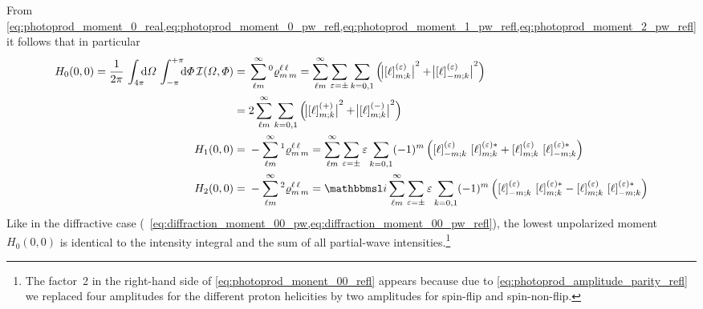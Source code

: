 From
\cref{eq:photoprod_moment_0_real,eq:photoprod_moment_0_pw_refl,eq:photoprod_moment_1_pw_refl,eq:photoprod_moment_2_pw_refl}
it follows that in particular
\begin{align}
  H_0(0, 0)
  = \frac{1}{2 \pi}\, \int_{4 \pi}\!\!\! \dif{\Omega}\, \int_{-\pi}^{+\pi}\!\!\! \dif{\Phi}\,
  \mathcal{I}(\Omega, \Phi)
  ={}& \sum_{\ell m}^\infty \prescript{0}{}{\varrho}^{\ell\, \ell}_{m\, m}
  = \sum_{\ell m}^\infty \sum_{\refl = \pm} \sum_{k = 0, 1}
  \rBrk[2]{\Abs[1]{\sBrk{\ell}^{(\refl)}_{m; k}}^2 + \Abs[1]{\sBrk{\ell}^{(\refl)}_{{-m}; k}}^2} \notag
  \\
  \label{eq:photoprod_monent_00_refl}
  ={}& 2 \sum_{\ell m}^\infty \sum_{k = 0, 1}
  \rBrk[2]{\Abs[1]{\sBrk{\ell}^{(+)}_{m; k}}^2 + \Abs[1]{\sBrk{\ell}^{(-)}_{m; k}}^2}
  \\
  H_1(0, 0)
  ={}& -\sum_{\ell m}^\infty \prescript{1}{}{\varrho}^{\ell\, \ell}_{m\, m}
  = \sum_{\ell m}^\infty \sum_{\refl = \pm} \refl \sum_{k = 0, 1}
  (-1)^m \rBrk[2]{\sBrk{\ell}^{(\refl)}_{{-m}; k}\, \sBrk{\ell}^{(\refl) *}_{m; k}
  + \sBrk{\ell}^{(\refl)}_{m; k}\, \sBrk{\ell}^{(\refl) *}_{{-m}; k}}
  \\
  H_2(0, 0)
  ={}& -\sum_{\ell m}^\infty \prescript{2}{}{\varrho}^{\ell\, \ell}_{m\, m}
  = \imag \sum_{\ell m}^\infty \sum_{\refl = \pm} \refl \sum_{k = 0, 1}
  (-1)^m \rBrk[2]{\sBrk{\ell}^{(\refl)}_{{-m}; k}\, \sBrk{\ell}^{(\refl) *}_{m; k}
  - \sBrk{\ell}^{(\refl)}_{m; k}\, \sBrk{\ell}^{(\refl) *}_{{-m}; k}}
\end{align}
Like in the diffractive case (\confer\
\cref{eq:diffraction_moment_00_pw,eq:diffraction_moment_00_pw_refl}),
the lowest unpolarized moment $H_0(0, 0)$ is identical to the
intensity integral and the sum of all partial-wave
intensities.\footnote{The factor~2 in the right-hand side of
\cref{eq:photoprod_monent_00_refl} appears because due to
\cref{eq:photoprod_amplitude_parity_refl} we replaced four amplitudes
for the different proton helicities by two amplitudes for spin-flip
and spin-non-flip.}

